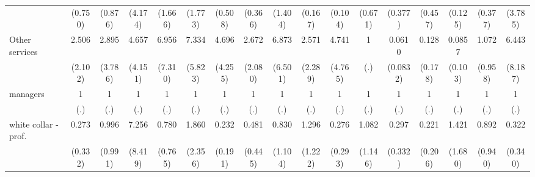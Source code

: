 {\begin{tabular}{l*{16}{c}}
                    &     (0.750)         &     (0.876)         &     (4.174)         &     (1.666)         &     (1.773)         &     (0.508)         &     (0.366)         &     (1.404)         &     (0.167)         &     (0.104)         &     (0.671)         &     (0.377)         &     (0.457)         &     (0.125)         &     (0.377)         &     (3.785)         \\
[1em]
Other services      &       2.506         &       2.895         &       4.657         &       6.956         &       7.334\sym{*}  &       4.696         &       2.672         &       6.873\sym{*}  &       2.571         &       4.741         &           1         &      0.0610\sym{*}  &       0.128         &      0.0857\sym{*}  &       1.072         &       6.443         \\
                    &     (2.102)         &     (3.786)         &     (4.151)         &     (7.310)         &     (5.823)         &     (4.255)         &     (2.080)         &     (6.501)         &     (2.289)         &     (4.765)         &         (.)         &    (0.0832)         &     (0.178)         &     (0.103)         &     (0.958)         &     (8.187)         \\
[1em]
managers            &           1         &           1         &           1         &           1         &           1         &           1         &           1         &           1         &           1         &           1         &           1         &           1         &           1         &           1         &           1         &           1         \\
                    &         (.)         &         (.)         &         (.)         &         (.)         &         (.)         &         (.)         &         (.)         &         (.)         &         (.)         &         (.)         &         (.)         &         (.)         &         (.)         &         (.)         &         (.)         &         (.)         \\
[1em]
white collar - prof.&       0.273         &       0.996         &       7.256         &       0.780         &       1.860         &       0.232         &       0.481         &       0.830         &       1.296         &       0.276         &       1.082         &       0.297         &       0.221         &       1.421         &       0.892         &       0.322         \\
                    &     (0.332)         &     (0.991)         &     (8.419)         &     (0.765)         &     (2.356)         &     (0.191)         &     (0.445)         &     (1.104)         &     (1.222)         &     (0.293)         &     (1.146)         &     (0.332)         &     (0.206)         &     (1.680)         &     (0.940)         &     (0.340)         \\

\end{tabular}}
